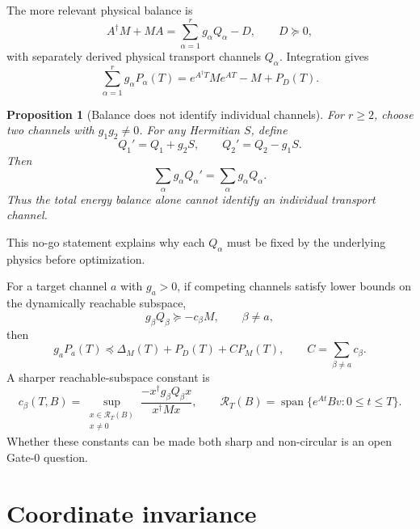 \documentclass[11pt,a4paper]{article}
\newtheorem{proposition}{Proposition}
\begin{document}
The more relevant physical balance is
\begin{equation}
  A^\dagger M+MA
  =\sum_{\alpha=1}^{r}g_\alpha Q_\alpha-D,
  \qquad D\succeq0,
  \label{eq:multibalance}
\end{equation}
with separately derived physical transport channels $Q_\alpha$. Integration gives
\begin{equation}
  \sum_{\alpha=1}^{r}g_\alpha P_\alpha(T)
  =e^{A^\dagger T}Me^{AT}-M+P_D(T).
  \label{eq:multibalanceintegrated}
\end{equation}

\begin{proposition}[Balance does not identify individual channels]
For $r\ge2$, choose two channels with $g_1g_2\neq0$. For any Hermitian $S$, define
\begin{equation}
  Q_1'=Q_1+g_2S,
  \qquad
  Q_2'=Q_2-g_1S.
\end{equation}
Then
\begin{equation}
  \sum_\alpha g_\alpha Q_\alpha'
  =\sum_\alpha g_\alpha Q_\alpha.
\end{equation}
Thus the total energy balance alone cannot identify an individual transport channel.
\end{proposition}

This no-go statement explains why each $Q_\alpha$ must be fixed by the underlying physics before optimization.

For a target channel $a$ with $g_a>0$, if competing channels satisfy lower bounds on the dynamically reachable subspace,
\begin{equation}
  g_\beta Q_\beta\succeq -c_\beta M,
  \qquad \beta\neq a,
\end{equation}
then
\begin{equation}
  g_aP_a(T)
  \preceq
  \Delta_M(T)+P_D(T)+C P_M(T),
  \qquad
  C=\sum_{\beta\neq a}c_\beta.
\end{equation}
A sharper reachable-subspace constant is
\begin{equation}
  c_\beta(T,B)
  =\sup_{\substack{x\in\mathcal{R}_T(B)\\x\neq0}}
  \frac{-x^\dagger g_\beta Q_\beta x}{x^\dagger Mx},
  \qquad
  \mathcal{R}_T(B)=\operatorname{span}\{e^{At}Bv:0\le t\le T\}.
\end{equation}
Whether these constants can be made both sharp and non-circular is an open Gate-0 question.

\section{Coordinate invariance}
\end{document}
